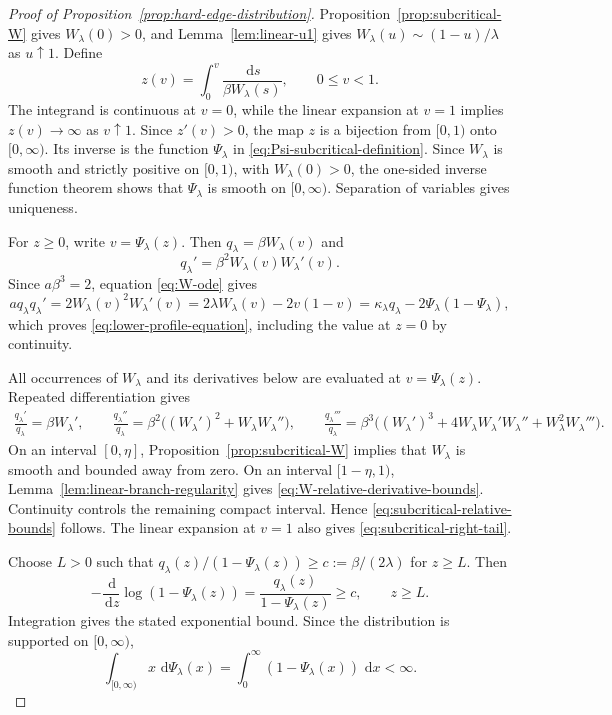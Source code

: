 \documentclass[12pt,preprint]{amsart}
\numberwithin{equation}{section}
\theoremstyle{plain}
\theoremstyle{definition}
\newcommand{\dd}{\,\mathrm d}
\begin{document}
\begin{proof}[Proof of Proposition~\ref{prop:hard-edge-distribution}]
Proposition~\ref{prop:subcritical-W} gives $W_{\lambda}(0)>0$, and
Lemma~\ref{lem:linear-u1} gives
$W_{\lambda}(u)\sim(1-u)/\lambda$ as $u\uparrow1$.  Define
\[
 z(v)=\int_0^v\frac{\dd s}{\beta W_{\lambda}(s)},
 \qquad 0\le v<1.
\]
The integrand is continuous at $v=0$, while the linear expansion at $v=1$
implies $z(v)\to\infty$ as $v\uparrow1$.  Since $z'(v)>0$, the map $z$ is
a bijection from $[0,1)$ onto $[0,\infty)$.  Its inverse is the function
$\Psi_{\lambda}$ in \eqref{eq:Psi-subcritical-definition}.  Since
$W_{\lambda}$ is smooth and strictly positive on $[0,1)$, with
$W_{\lambda}(0)>0$, the one-sided inverse function theorem shows that
$\Psi_{\lambda}$ is smooth on $[0,\infty)$.  Separation of variables gives
uniqueness.

For $z\ge0$, write $v=\Psi_{\lambda}(z)$.  Then
$q_{\lambda}=\beta W_{\lambda}(v)$ and
\[
 q_{\lambda}'=\beta^2W_{\lambda}(v)W_{\lambda}'(v).
\]
Since $a\beta^3=2$, equation \eqref{eq:W-ode} gives
\[
 a q_{\lambda}q_{\lambda}'
 =2W_{\lambda}(v)^2W_{\lambda}'(v)
 =2\lambda W_{\lambda}(v)-2v(1-v)
 =\kappa_{\lambda}q_{\lambda}
  -2\Psi_{\lambda}(1-\Psi_{\lambda}),
\]
which proves \eqref{eq:lower-profile-equation}, including the value at
$z=0$ by continuity.

All occurrences of $W_{\lambda}$ and its derivatives below are evaluated at
$v=\Psi_{\lambda}(z)$.  Repeated differentiation gives
\[
\begin{aligned}
 \frac{q_{\lambda}'}{q_{\lambda}}
 =\beta W_{\lambda}',\qquad
 \frac{q_{\lambda}''}{q_{\lambda}}
 =\beta^2\bigl((W_{\lambda}')^2
   +W_{\lambda}W_{\lambda}''\bigr),\qquad
 \frac{q_{\lambda}'''}{q_{\lambda}}
 =\beta^3\bigl((W_{\lambda}')^3
   +4W_{\lambda}W_{\lambda}'W_{\lambda}''
   +W_{\lambda}^2W_{\lambda}'''\bigr).
\end{aligned}
\]
On an interval $[0,\eta]$, Proposition~\ref{prop:subcritical-W} implies that
$W_{\lambda}$ is smooth and bounded away from zero.  On an interval
$[1-\eta,1)$, Lemma~\ref{lem:linear-branch-regularity} gives
\eqref{eq:W-relative-derivative-bounds}.  Continuity controls the remaining
compact interval.  Hence \eqref{eq:subcritical-relative-bounds} follows.
The linear expansion at $v=1$ also gives
\eqref{eq:subcritical-right-tail}.

Choose $L>0$ such that
$q_{\lambda}(z)/(1-\Psi_{\lambda}(z))\ge
c:=\beta/(2\lambda)$ for $z\ge L$.  Then
\[
 -\frac{\dd}{\dd z}\log(1-\Psi_{\lambda}(z))
 =\frac{q_{\lambda}(z)}{1-\Psi_{\lambda}(z)}\ge c,
 \qquad z\ge L.
\]
Integration gives the stated exponential bound.  Since the distribution is
supported on $[0,\infty)$,
\[
 \int_{[0,\infty)}x\,\dd\Psi_{\lambda}(x)
 =\int_0^\infty(1-\Psi_{\lambda}(x))\,\dd x<\infty.
\]


\end{proof}
\end{document}
